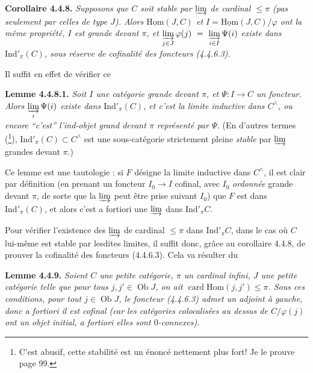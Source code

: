 \documentclass[11pt]{article}
\newcommand{\printedpage}[1]{\marginpar{\footnotesize p.~#1}}
\newcommand{\msp}[1]{\marginpar{\footnotesize [#1]}}
\newcommand{\uHom}{\underline{\mathrm{Hom}}}
\newcommand{\Hom}{\mathrm{Hom}}
\newcommand{\Ind}{\mathrm{Ind}}
\newcommand{\Ob}{\operatorname{Ob}}
\newcommand{\card}{\operatorname{card}}
\begin{document}
\textbf{Corollaire 4.4.8.} \textit{Supposons que $C$ soit stable par $\varinjlim$ de cardinal $\leqslant \pi$ (pas seulement par celles de type $J$). Alors $\uHom(J,C)$ et $I = \uHom(J,C)/\varphi$ ont la même propriété, $I$ est grande devant $\pi$, et $\varinjlim\limits_{j\in J} \varphi(j) \ =\ \varinjlim\limits_{i\in I} \Psi(i)$ existe dans $\Ind'_\pi(C)$, sous réserve de cofinalité des foncteurs (4.4.6.3).}

\printedpage{21}
Il suffit en effet de vérifier ce

\textbf{Lemme 4.4.8.1.} \textit{Soit $I$ une catégorie grande devant $\pi$, et $\Psi : I \longrightarrow C$ un foncteur. Alors $\varinjlim\limits_{i} \Psi(i)$ existe dans $\Ind'_\pi(C)$, et c'est la limite inductive dans $C^\wedge$, ou encore “c'est” l'ind-objet grand devant $\pi$ représenté par $\Psi$.} (En d'autres termes (\footnote[24]{C'est abusif, cette stabilité est un énoncé nettement plus fort! Je le prouve page 99.}), $\Ind'_\pi(C) \subset C^\wedge$ est une sous-catégorie strictement pleine \textit{stable} par $\varinjlim$ grandes devant $\pi$.)

\msp{page 89}
Ce lemme est une tautologie : si $F$ désigne la limite inductive dans $C^\wedge$, il est clair par définition (en prenant un foncteur $I_0 \longrightarrow I$ cofinal, avec $I_0$ \textit{ordonnée} grande devant $\pi$, de sorte que la $\varinjlim$ peut être prise suivant $I_0$) que $F$ est dans $\Ind'_\pi(C)$, et alors c'est a fortiori une $\varinjlim$ dans $\Ind'_\pi C$.

Pour vérifier l'existence des $\varinjlim$ de cardinal $\leqslant \pi$ dans $\Ind'_\pi C$, dans le cas où $C$ lui-même est stable par lesdites limites, il suffit donc, grâce au corollaire 4.4.8, de prouver la cofinalité des foncteurs (4.4.6.3). Cela va résulter du

\textbf{Lemme 4.4.9.} \textit{Soient $C$ une petite catégorie, $\pi$ un cardinal infini, $J$ une petite catégorie telle que pour tous $j, j' \in \Ob J$, on ait $\card \Hom(j,j') \leqslant \pi$. Sous ces conditions, pour tout $j \in \Ob J$, le foncteur (4.4.6.3) \textup{admet un adjoint à gauche,} donc a fortiori il est cofinal (car les catégories colocalisées au dessus de $C/\varphi(j)$ ont un objet initial, a fortiori elles sont $0$-connexes).}
\end{document}
